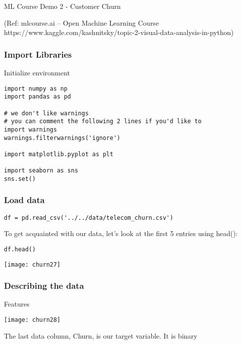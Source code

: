 \begin{frame}
\begin{center}
{\Large ML Course Demo 2 - Customer Churn}
\end{center}

{\tiny (Ref: mlcourse.ai – Open Machine Learning Course \\
 https://www.kaggle.com/kashnitsky/topic-2-visual-data-analysis-in-python) }
\end{frame}

\begin{frame}[fragile]\frametitle{Import Libraries}
Initialize environment
\begin{lstlisting}
import numpy as np
import pandas as pd

# we don't like warnings
# you can comment the following 2 lines if you'd like to
import warnings
warnings.filterwarnings('ignore')

import matplotlib.pyplot as plt

import seaborn as sns
sns.set()
\end{lstlisting}
\end{frame}

\begin{frame}[fragile]\frametitle{Load data}
\begin{lstlisting}
df = pd.read_csv('../../data/telecom_churn.csv')
\end{lstlisting}
To get acquainted with our data, let’s look at the first 5 entries using head():
\begin{lstlisting}
df.head()
\end{lstlisting}

\begin{center}
\texttt{[image: churn27]}
\end{center}
\end{frame}


\begin{frame}[fragile]\frametitle{Describing  the data}
Features
\begin{center}
\texttt{[image: churn28]}
\end{center}
The last data column, Churn, is our target variable. It is binary
\end{frame}

